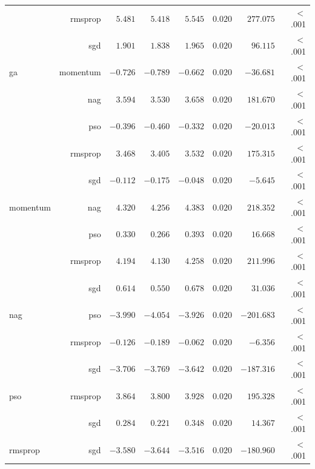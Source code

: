 \begin{table}[htbp]
{\begin{tabular}{lrrrrrrr}
			 & rmsprop & $5.481$ & $5.418$ & $5.545$ & $0.020$ & $277.075$ & $<$ .001  \\
			 & sgd & $1.901$ & $1.838$ & $1.965$ & $0.020$ & $96.115$ & $<$ .001  \\
			ga & momentum & $-0.726$ & $-0.789$ & $-0.662$ & $0.020$ & $-36.681$ & $<$ .001  \\
			$ $ & nag & $3.594$ & $3.530$ & $3.658$ & $0.020$ & $181.670$ & $<$ .001  \\
			 & pso & $-0.396$ & $-0.460$ & $-0.332$ & $0.020$ & $-20.013$ & $<$ .001  \\
			 & rmsprop & $3.468$ & $3.405$ & $3.532$ & $0.020$ & $175.315$ & $<$ .001  \\
			 & sgd & $-0.112$ & $-0.175$ & $-0.048$ & $0.020$ & $-5.645$ & $<$ .001  \\
			momentum & nag & $4.320$ & $4.256$ & $4.383$ & $0.020$ & $218.352$ & $<$ .001  \\
			$ $ & pso & $0.330$ & $0.266$ & $0.393$ & $0.020$ & $16.668$ & $<$ .001  \\
			 & rmsprop & $4.194$ & $4.130$ & $4.258$ & $0.020$ & $211.996$ & $<$ .001  \\
			 & sgd & $0.614$ & $0.550$ & $0.678$ & $0.020$ & $31.036$ & $<$ .001  \\
			nag & pso & $-3.990$ & $-4.054$ & $-3.926$ & $0.020$ & $-201.683$ & $<$ .001  \\
			$ $ & rmsprop & $-0.126$ & $-0.189$ & $-0.062$ & $0.020$ & $-6.356$ & $<$ .001  \\
			 & sgd & $-3.706$ & $-3.769$ & $-3.642$ & $0.020$ & $-187.316$ & $<$ .001  \\
			pso & rmsprop & $3.864$ & $3.800$ & $3.928$ & $0.020$ & $195.328$ & $<$ .001  \\
			$ $ & sgd & $0.284$ & $0.221$ & $0.348$ & $0.020$ & $14.367$ & $<$ .001  \\
			rmsprop & sgd & $-3.580$ & $-3.644$ & $-3.516$ & $0.020$ & $-180.960$ & $<$ .001  \\
			\bottomrule
		\end{tabular}
	}
\end{table}

